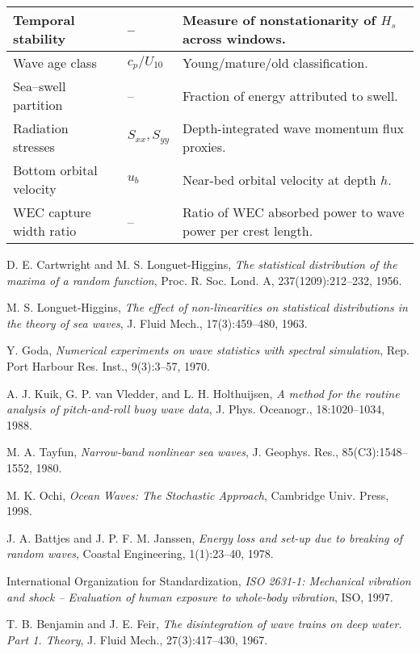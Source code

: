 \documentclass[11pt]{article}
\begin{document}
\begin{longtable}{|l|l|p{8cm}|}
\hline
Temporal stability & -- & Measure of nonstationarity of $H_s$ across windows. \\
\hline
Wave age class & $c_p/U_{10}$ & Young/mature/old classification. \\
Sea–swell partition & -- & Fraction of energy attributed to swell. \\
Radiation stresses & $S_{xx},S_{yy}$ & Depth-integrated wave momentum flux proxies. \\
\hline
Bottom orbital velocity & $u_b$ & Near-bed orbital velocity at depth $h$. \\
WEC capture width ratio & -- & Ratio of WEC absorbed power to wave power per crest length. \\
\end{longtable}

\begin{thebibliography}{9}
D. E. Cartwright and M. S. Longuet-Higgins,
\textit{The statistical distribution of the maxima of a random function},
Proc. R. Soc. Lond. A, 237(1209):212–232, 1956.

M. S. Longuet-Higgins,
\textit{The effect of non-linearities on statistical distributions in the theory of sea waves},
J. Fluid Mech., 17(3):459–480, 1963.

Y. Goda,
\textit{Numerical experiments on wave statistics with spectral simulation},
Rep. Port Harbour Res. Inst., 9(3):3–57, 1970.

A. J. Kuik, G. P. van Vledder, and L. H. Holthuijsen,
\textit{A method for the routine analysis of pitch-and-roll buoy wave data},
J. Phys. Oceanogr., 18:1020–1034, 1988.

M. A. Tayfun,
\textit{Narrow-band nonlinear sea waves},
J. Geophys. Res., 85(C3):1548–1552, 1980.

M. K. Ochi,
\textit{Ocean Waves: The Stochastic Approach},
Cambridge Univ. Press, 1998.

J. A. Battjes and J. P. F. M. Janssen,
\textit{Energy loss and set-up due to breaking of random waves},
Coastal Engineering, 1(1):23--40, 1978.

International Organization for Standardization,
\textit{ISO 2631-1: Mechanical vibration and shock -- Evaluation of human exposure to whole-body vibration},
ISO, 1997.

T. B. Benjamin and J. E. Feir,
\textit{The disintegration of wave trains on deep water. Part 1. Theory},
J. Fluid Mech., 27(3):417--430, 1967.
\end{thebibliography}
\end{document}
